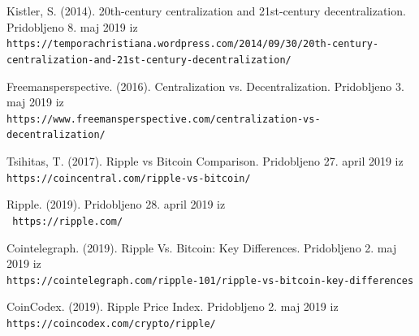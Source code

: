 \documentclass[letterpaper, titlepage, freqn]{article}
\begin{document}
\begin{thebibliography}{9}


\bibitem{} 
Kistler, S. (2014). 20th-century centralization and 21st-century decentralization. Pridobljeno 8. maj 2019 iz
\\\texttt{https://temporachristiana.wordpress.com/2014/09/30/20th-century-centralization-and-21st-century-decentralization/}

\bibitem{} 
Freemansperspective. (2016). Centralization vs. Decentralization. Pridobljeno 3. maj 2019 iz
\\\texttt{https://www.freemansperspective.com/centralization-vs-decentralization/}

\bibitem{} 
Tsihitas, T. (2017). Ripple vs Bitcoin Comparison. Pridobljeno 27. april 2019 iz
\\\texttt{https://coincentral.com/ripple-vs-bitcoin/}

\bibitem{} 
Ripple. (2019). Pridobljeno 28. april 2019 iz
\\\texttt{ https://ripple.com/}

\bibitem{} 
Cointelegraph. (2019). Ripple Vs. Bitcoin: Key Differences. Pridobljeno 2. maj 2019 iz
\\\texttt{https://cointelegraph.com/ripple-101/ripple-vs-bitcoin-key-differences}

\bibitem{} 
CoinCodex. (2019). Ripple Price Index. Pridobljeno 2. maj 2019 iz
\\\texttt{https://coincodex.com/crypto/ripple/}








\end{thebibliography}
\end{document}
